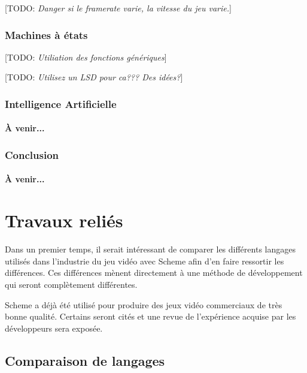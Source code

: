 \documentclass[12pt,oneside,letterpaper,francais]{book}
\newcommand{\todo}[1]{[TODO: {\it #1}]}
\begin{document}
\todo{Danger si le framerate varie, la vitesse du jeu varie.}

\subsection{Machines à états}
\todo{Utiliation des fonctions génériques}

\todo{Utilisez un LSD pour ca??? Des idées?}

\subsection{Intelligence Artificielle}
\subsubsection{À venir...}

\subsection{Conclusion}
\subsubsection{À venir...}




\chapter{Travaux reliés}

Dans un premier temps, il serait intéressant de comparer les
différents langages utilisés dans l'industrie du jeu vidéo avec Scheme
afin d'en faire ressortir les différences. Ces différences mènent
directement à une méthode de développement qui seront complètement
différentes.

Scheme a déjà été utilisé pour produire des jeux vidéo commerciaux de
très bonne qualité. Certains seront cités et une revue de l'expérience
acquise par les développeurs sera exposée.

\section{Comparaison de langages}
\end{document}
